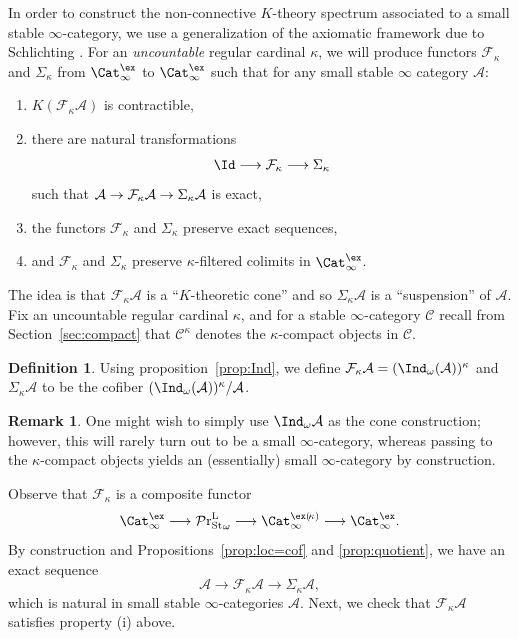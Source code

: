 \documentclass{amsart}
\renewcommand{\to}{\mathchoice{\longrightarrow}{\rightarrow}{\rightarrow}{\rightarrow}}
\newcommand{\cA}{{\mathcal A}}
\newcommand{\cF}{{\mathcal F}}
\let\catsymbfont\mathcal
\newcommand{\aA}{{\catsymbfont{A}}}
\newcommand{\aC}{{\catsymbfont{C}}}
\newcommand{\stabcat}{\Cat_\i^{\ex}}
\newcommand{\kstabcat}{\Cat_\i^{\ex(\!\kappa)}}
\newcommand{\stabprcat}{{{\mathcal{P}\mathrm{r}}^{\mathrm{L}}_\mathrm{St}}}
\newcommand{\too}{\longrightarrow}%
\renewcommand{\i}{\infty}
\newcommand{\kcone}{\cF_{\kappa}}
\newcommand{\ksusp}{\Sigma_{\kappa}}
\numberwithin{equation}{section}
\theoremstyle{definition}
\newtheorem{definition}[equation]{Definition}
\newtheorem{remark}[equation]{Remark}
\begin{document}
In order to construct the non-connective $K$-theory spectrum associated
to a small stable $\i$-category, we use a generalization of the
axiomatic framework due to Schlichting \cite{Marco}.  For an
{\em uncountable} regular cardinal $\kappa$, we will produce functors
$\kcone$ and $\ksusp$ from $\stabcat$ to $\stabcat$ such that for any
small stable $\i$ category $\aA$:
\begin{enumerate}
\item $K(\kcone \aA)$ is contractible,
\item there are natural transformations
\[
\Id \to \kcone \to \ksusp
\]
such that $\aA \to \kcone \aA \to \ksusp \aA$ is exact,
\item the functors $\kcone$ and $\ksusp$ preserve exact sequences,
\item and $\kcone$ and $\ksusp$ preserve $\kappa$-filtered colimits in
$\stabcat$.
\end{enumerate}

The idea is that $\kcone \aA$ is a ``$K$-theoretic cone'' and so
$\ksusp \aA$ is a ``suspension'' of $\aA$.  Fix an uncountable regular
cardinal $\kappa$, and for a stable $\i$-category $\aC$ recall from
Section~\ref{sec:compact} that $\aC^{\kappa}$ denotes the
$\kappa$-compact objects in $\aC$.

\begin{definition}\label{def:setup}
Using proposition~\ref{prop:Ind}, we define $\kcone \cA
= (\Ind_\omega(\cA))^{\kappa}$ and $\ksusp \cA$ to be the
cofiber $(\Ind_\omega(\cA))^{\kappa}/\cA$.  
\end{definition}

\begin{remark}
One might wish to simply use $\Ind_{\omega} \aA$ as the cone
construction; however, this will rarely turn out to be a small
$\i$-category, whereas passing to the $\kappa$-compact objects yields
an (essentially) small $\i$-category by construction.
\end{remark}

Observe that $\kcone$ is a composite functor
\begin{equation}\label{eq:composed-functor}
\stabcat \to \stabprcat_\omega \to \kstabcat\to\stabcat.
\end{equation}
By construction and Propositions~\ref{prop:loc=cof}
and \ref{prop:quotient}, we have an exact sequence
\[
\cA \too \kcone \cA \too \ksusp \cA,
\]
which is natural in small stable $\i$-categories $\cA$.  Next, we
check that $\kcone \cA$ satisfies property (i) above.
\end{document}
